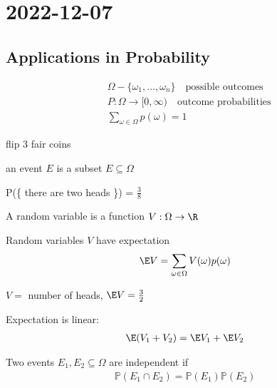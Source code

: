 \section{2022-12-07}

\subsection{Applications in Probability}

\begin{definition}
	\begin{align*}
		&\Omega - \{ \omega_1, \ldots , \omega_n \} \quad \text{possible outcomes} \\
		&P : \Omega \to [0,\infty) \quad \text{outcome probabilities} \\
		&\sum_{\omega \in \Omega} p(\omega) = 1
	\end{align*} 
\end{definition}

\begin{example}
	flip 3 fair coins
\end{example}

an event $E$ is a subset $E \subseteq \Omega$

\begin{example}
	P(\{ there are two heads \}) = $\frac{3}{8}$
\end{example}

\begin{definition}
	A random variable is a function $V : \Omega \to \R$

	Random variables  $V$ have expectation 
	 \begin{align*}
		\E V = \sum_{\omega \in \Omega} V(\omega) p(\omega)
	\end{align*} 
\end{definition}

\begin{example}
	$V =$ number of heads, $\E V = \frac{3}{2}$
\end{example}

Expectation is linear:
\begin{align*}
	\E (V_1 + V_2) = \E V_1 + \E V_2
\end{align*} 

Two events $E_1, E_2 \subseteq \Omega$ are independent if 
\begin{align*}
	\mathbb{P} (E_1 \cap E_2 ) = \mathbb{P} (E_1) \mathbb{P} (E_2)
\end{align*} 


